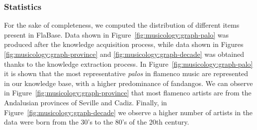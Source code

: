 \subsubsection{Statistics}
\label{sec:musicology:statistics}

For the sake of completeness, we computed the distribution of different items present in FlaBase. 
Data shown in Figure~\ref{fig:musicology:graph-palo} was produced after the knowledge acquisition process, while data shown in Figures \ref{fig:musicology:graph-province} and \ref{fig:musicology:graph-decade} was obtained thanks to the knowledge extraction process. In Figure~\ref{fig:musicology:graph-palo} it is shown that the most representative \textit{palos} in flamenco music are represented in our knowledge base, with a higher predominance of fandangos. We can observe in Figure~\ref{fig:musicology:graph-province} that most flamenco artists are from the Andalusian provinces of Seville and Cadiz. 
Finally, in Figure~\ref{fig:musicology:graph-decade} we observe a higher number of artists in the data were born from the 30's to the 80's of the 20th century.


